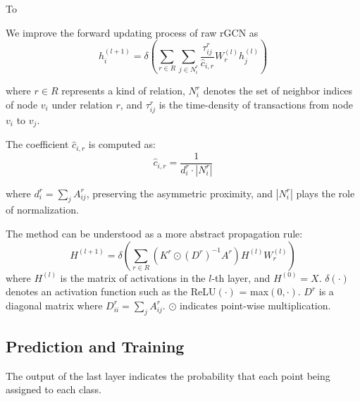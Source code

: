 
To 

We improve the forward updating process of raw rGCN as 
\begin{equation}
h_i^{(l+1)}=\delta(\sum_{r\in R} \sum_{j \in N_i^r} \frac{\tau_{ij}^r}{\hat c_{i,r}}W_r^{(l)}h_j^{(l)})
\end{equation}

\noindent where $r \in R$ represents a kind of relation, $N_i^r$ denotes the set of neighbor indices of node $v_i$ under relation $r$, and $\tau_{ij}^r$ is the time-density of transactions from node $v_i$ to $v_j$. 

The coefficient $\hat c_{i,r}$ is computed as:
\begin{equation}
\hat c_{i,r}=\frac{1}{d_i^r\cdot |N_i^r|}
\end{equation}

\noindent where $d_i^r=\sum_{j}A^r_{ij}$, preserving the asymmetric proximity, and $|N_i^r|$ plays the role of normalization.

The method can be understood as a more abstract propagation rule:
\begin{equation}
H^{(l+1)}=\delta(\sum_{r\in R} (K^r\odot (D^r)^{-1}A^r)H^{(l)}W_r^{(l)})
\end{equation}
\noindent where $H^{(l)}$ is the matrix of activations in the $l$-th layer, and $H^{(0)}=X$. $\delta(\cdot)$ denotes an activation function such as the ReLU$(\cdot)$ = max$(0,\cdot)$. $D^r$ is a diagonal matrix where $D^r_{ii}=\sum_{j}A^r_{ij}$. $\odot$ indicates point-wise multiplication.

\subsection{Prediction and Training}
The output of the last layer indicates the probability that each point being assigned to each class.

